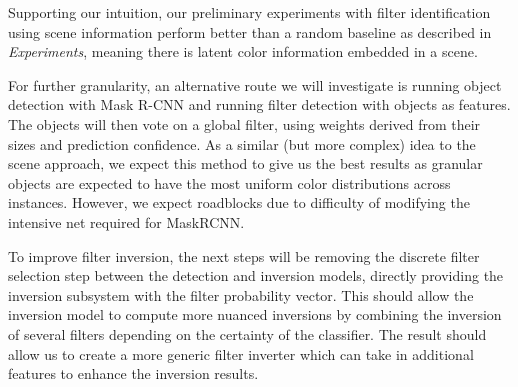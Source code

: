 \documentclass[11pt]{article}
\begin{document}
Supporting our intuition, our preliminary experiments with filter identification using scene information perform better than a random baseline as described in \textit{Experiments}, meaning there is latent color information embedded in a scene.

For further granularity, an alternative route we will investigate is running object detection with Mask R-CNN \cite{MaskRCNN} and running filter detection with objects as features. The objects will then vote on a global filter, using weights derived from their sizes and prediction confidence. As a similar (but more complex) idea to the scene approach, we expect this method to give us the best results as granular objects are expected to have the most uniform color distributions across instances. However, we expect roadblocks due to difficulty of modifying the intensive net required for MaskRCNN.

To improve filter inversion, the next steps will be removing the discrete filter selection step between the detection and inversion models, directly providing the inversion subsystem with the filter probability vector. This should allow the inversion model to compute more nuanced inversions by combining the inversion of several filters depending on the certainty of the classifier. The result should allow us to create a more generic filter inverter which can take in additional features to enhance the inversion results.
\end{document}
